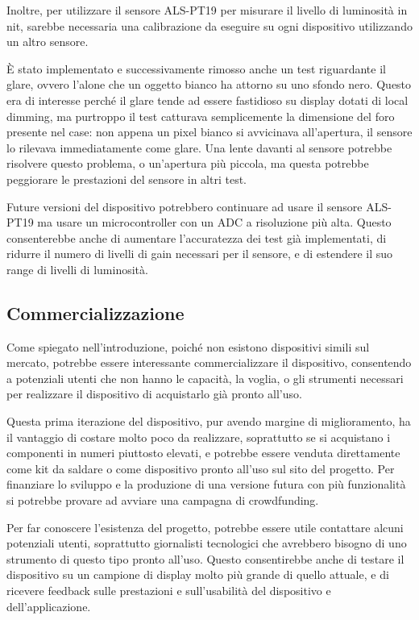 Inoltre, per utilizzare il sensore ALS-PT19 per misurare il livello di luminosità in nit, sarebbe necessaria una calibrazione da eseguire su ogni dispositivo utilizzando un altro sensore.

È stato implementato e successivamente rimosso anche un test riguardante il glare, ovvero l'alone che un oggetto bianco ha attorno su uno sfondo nero. Questo era di interesse perché il glare tende ad essere fastidioso su display dotati di local dimming, ma purtroppo il test catturava semplicemente la dimensione del foro presente nel case: non appena un pixel bianco si avvicinava all'apertura, il sensore lo rilevava immediatamente come glare. Una lente davanti al sensore potrebbe risolvere questo problema, o un'apertura più piccola, ma questa potrebbe peggiorare le prestazioni del sensore in altri test.

Future versioni del dispositivo potrebbero continuare ad usare il sensore ALS-PT19 ma usare un microcontroller con un ADC a risoluzione più alta. Questo consenterebbe anche di aumentare l'accuratezza dei test già implementati, di ridurre il numero di livelli di gain necessari per il sensore, e di estendere il suo range di livelli di luminosità.

\subsection{Commercializzazione}
Come spiegato nell'introduzione, poiché non esistono dispositivi simili sul mercato, potrebbe essere interessante commercializzare il dispositivo, consentendo a potenziali utenti che non hanno le capacità, la voglia, o gli strumenti necessari per realizzare il dispositivo di acquistarlo già pronto all'uso.

Questa prima iterazione del dispositivo, pur avendo margine di miglioramento, ha il vantaggio di costare molto poco da realizzare, soprattutto se si acquistano i componenti in numeri piuttosto elevati, e potrebbe essere venduta direttamente come kit da saldare o come dispositivo pronto all'uso sul sito del progetto. Per finanziare lo sviluppo e la produzione di una versione futura con più funzionalità si potrebbe provare ad avviare una campagna di crowdfunding.

Per far conoscere l'esistenza del progetto, potrebbe essere utile contattare alcuni potenziali utenti, soprattutto giornalisti tecnologici che avrebbero bisogno di uno strumento di questo tipo pronto all'uso. Questo consentirebbe anche di testare il dispositivo su un campione di display molto più grande di quello attuale, e di ricevere feedback sulle prestazioni e sull'usabilità del dispositivo e dell'applicazione.

